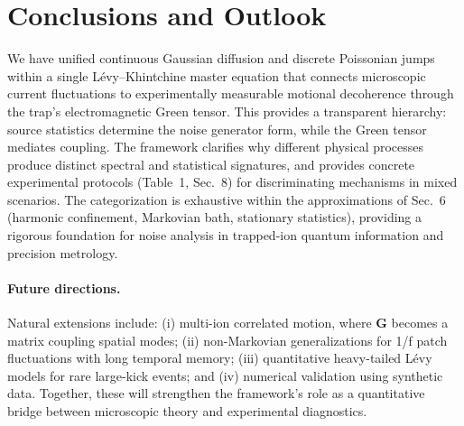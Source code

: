 \section{Conclusions and Outlook}
\label{sec:conclusion}

We have unified continuous Gaussian diffusion and discrete Poissonian jumps within a single Lévy–Khintchine master equation that connects microscopic current fluctuations to experimentally measurable motional decoherence through the trap's electromagnetic Green tensor. This provides a transparent hierarchy: source statistics determine the noise generator form, while the Green tensor mediates coupling. The framework clarifies why different physical processes produce distinct spectral and statistical signatures, and provides concrete experimental protocols (Table~1, Sec.~8) for discriminating mechanisms in mixed scenarios.
The categorization is exhaustive within the approximations of Sec.~6 (harmonic confinement, Markovian bath, stationary statistics), providing a rigorous foundation for noise analysis in trapped-ion quantum information and precision metrology.

\paragraph{Future directions.} Natural extensions include: (i) multi-ion correlated motion, where $\mathbf{G}$ becomes a matrix coupling spatial modes; (ii) non-Markovian generalizations for 1/f patch fluctuations with long temporal memory; (iii) quantitative heavy-tailed Lévy models for rare large-kick events; and (iv) numerical validation using synthetic data. Together, these will strengthen the framework's role as a quantitative bridge between microscopic theory and experimental diagnostics.